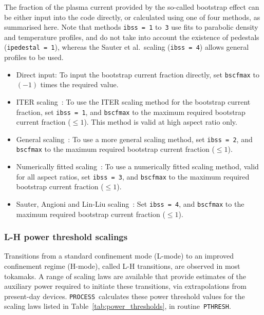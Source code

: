 \documentclass[11pt,a4paper]{report}
\newcommand{\process}{\mbox{\texttt{PROCESS}}}
\begin{document}
The fraction of the plasma current provided by the so-called bootstrap effect
can be either input into the code directly, or calculated using one of four
methods, as summarised here. Note that methods \texttt{ibss = 1} to~\texttt{3}
use fits to parabolic density and temperature profiles, and do not take into
account the existence of pedestals (\texttt{ipedestal = 1}), whereas the
Sauter et al.\ scaling (\texttt{ibss = 4}) allows general profiles to be used.

\begin{itemize}

\item Direct input: To input the bootstrap current fraction directly, set
  \texttt{bscfmax} to $(-1)$ times the required value.

\item ITER scaling~\cite{IPDG}: To use the ITER scaling method for the
  bootstrap current fraction, set \texttt{ibss = 1}, and \texttt{bscfmax} to
  the maximum required bootstrap current fraction ($\leq 1$). This method is
  valid at high aspect ratio only.

\item General scaling~\cite{Nevins}: To use a more general scaling method, set
  \texttt{ibss = 2}, and \texttt{bscfmax} to the maximum required bootstrap
  current fraction ($\leq 1$).

\item Numerically fitted scaling~\cite{WilsonBS}: To use a numerically fitted
  scaling method, valid for all aspect ratios, set \texttt{ibss = 3}, and
  \texttt{bscfmax} to the maximum required bootstrap current fraction ($\leq
  1$).

\item Sauter, Angioni and Lin-Liu scaling~\cite{SauterBS, SauterBS_errata}:
  Set \texttt{ibss = 4}, and \texttt{bscfmax} to the maximum required
  bootstrap current fraction ($\leq 1$).

\end{itemize}

\subsubsection{L-H power threshold scalings}

Transitions from a standard confinement mode (L-mode) to an improved
confinement regime (H-mode), called L-H transitions, are observed in most
tokamaks. A range of scaling laws are available that provide estimates of the
auxiliary power required to initiate these transitions, via extrapolations
from present-day devices. \process\ calculates these power threshold values
for the scaling laws listed in Table~\ref{tab:power_thresholds}, in
routine~\texttt{PTHRESH}.
\end{document}
